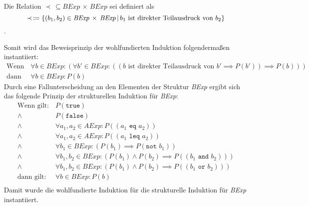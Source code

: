 					Die Relation $ \prec \,\subseteq \textit{BExp} \,\times\, \textit{BExp} $ sei definiert als \[ \prec \,\coloneqq \{ (b _ 1, b _ 2) \in \textit{BExp} \,\times\, \textit{BExp} \,\vert\, b _ 1 \text{ ist direkter Teilausdruck von } b _ 2 \} \].

					Somit wird das Beweisprinzip der wohlfundierten Induktion folgendermaßen instantiiert:
					\begin{align*}
						\text{Wenn gilt:} & \,\forall b \in \textit{BExp} : (\forall b' \in \textit{BExp} : ((b \text{ ist direkter Teilausdruck von } b' \implies P(b')) \implies P(b))) \\
						\text{dann gilt:} & \,\forall b \in \textit{BExp} : P(b)
					\end{align*}
					Durch eine Fallunterscheidung an den Elementen der Struktur \textit{BExp} ergibt sich das folgende Prinzip der strukturellen Induktion für \textit{BExp}:
					\begin{align*}
						\text{Wenn gilt:} & \,P(\texttt{true})                                                                                            \\
						\land             & \,P(\texttt{false})                                                                                           \\
						\land             & \,\forall a _ 1, a _ 2 \in \textit{AExp} : P((a _ 1 \texttt{ eq } a _ 2))                                     \\
						\land             & \,\forall a _ 1, a _ 2 \in \textit{AExp} : P((a _ 1 \texttt{ leq } a _ 2))                                    \\
						\land             & \,\forall b _ 1 \in \textit{BExp} : (P(b _ 1) \implies P(\texttt{not } b _ 1))                                \\
						\land             & \,\forall b _ 1, b _ 2 \in \textit{BExp} : (P(b _ 1) \land P(b _ 2) \implies P((b _ 1 \texttt{ and } b _ 2))) \\
						\land             & \,\forall b _ 1, b _ 2 \in \textit{BExp} : (P(b _ 1) \land P(b _ 2) \implies P((b _ 1 \texttt{ or } b _ 2)))  \\
						\text{dann gilt:} & \,\forall b \in \textit{BExp} : P(b)                                                                          \\
					\end{align*}
					Damit wurde die wohlfundierte Induktion für die strukturelle Induktion für \textit{BExp} instantiiert.

